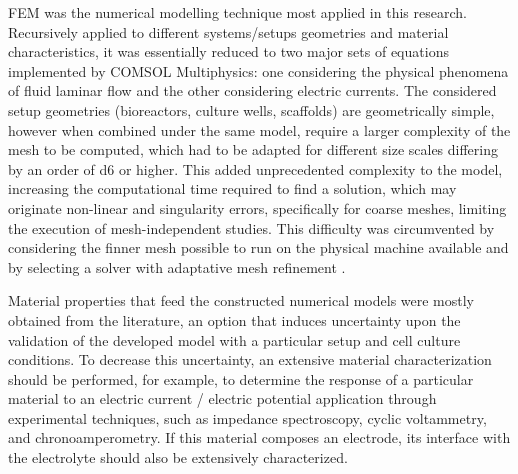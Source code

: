 \acs{FEM} was the numerical modelling technique most applied in this research. Recursively applied to different systems/setups geometries and material characteristics, it was essentially reduced to two major sets of equations implemented by COMSOL Multiphysics: one considering the physical phenomena of fluid laminar flow and the other considering electric currents. The considered setup geometries (bioreactors, culture wells, scaffolds) are geometrically simple, however when combined under the same model, require a larger complexity of the mesh to be computed, which had to be adapted for different size scales differing by an order of \num{d6} or higher. This added unprecedented complexity to the model, increasing the computational time required to find a solution, which may originate non-linear and singularity errors, specifically for coarse meshes, limiting the execution of mesh-independent studies. This difficulty was circumvented by considering the finner mesh possible to run on the physical machine available and by selecting a solver with adaptative mesh refinement \cite{Verfuhrt1996-hy}.

Material properties that feed the constructed numerical models were mostly obtained from the literature, an option that induces uncertainty upon the validation of the developed model with a particular setup and cell culture conditions. To decrease this uncertainty, an extensive material characterization should be performed, for example, to determine the response of a particular material to an electric current / electric potential application through experimental techniques, such as impedance spectroscopy, cyclic voltammetry, and chronoamperometry. If this material composes an electrode, its interface with the electrolyte should also be extensively characterized.    

